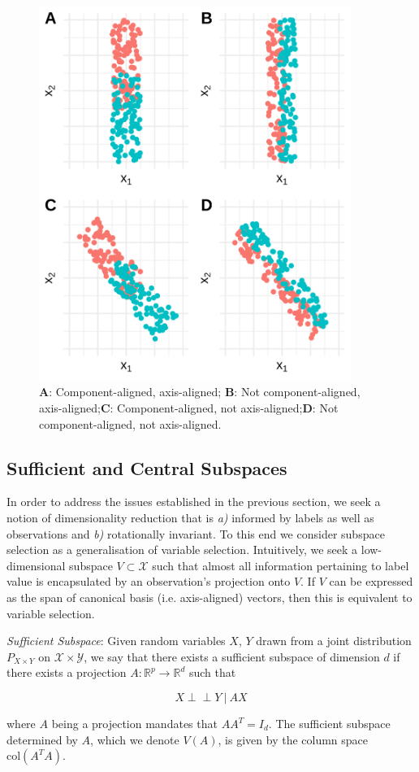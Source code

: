 \documentclass[12pt]{article}
\newenvironment{definition}[1][Definition]{\begin{trivlist}
\item[\hskip \labelsep {\bfseries #1}]}{\end{trivlist}}
\begin{document}
\begin{figure}[htbp]
    \centering
    \includegraphics[width=4in]{figures/ExampleFigures.png}
    \caption{\textbf{A}: Component-aligned, axis-aligned; \textbf{B}: Not component-aligned, axis-aligned;\textbf{C}: Component-aligned, not axis-aligned;\textbf{D}: Not component-aligned, not axis-aligned.\label{fig:examplefigures}}
\end{figure}

\subsection{Sufficient  and Central Subspaces}
In order to address the issues established in the previous section, we seek a notion of dimensionality reduction that is \textit{a)} informed by labels as well as observations and \textit{b)} rotationally invariant. To this end we consider subspace selection as a generalisation of variable selection. Intuitively, we seek a low-dimensional subspace $V \subset \mathcal{X}$ such that almost all information pertaining to label value is encapsulated by an observation's projection onto $V$. If $V$ can be expressed as the span of canonical basis (i.e. axis-aligned) vectors, then this is equivalent to variable selection. 

\begin{definition}
    \textit{Sufficient Subspace}: Given random variables $X$, $Y$ drawn from a joint distribution $P_{X\times Y}$ on $\mathcal{X} \times \mathcal{Y}$, we say that there exists a sufficient subspace of dimension $d$ if there exists a projection $A : \mathbb{R}^p \rightarrow \mathbb{R}^d $ such that 
    
    \[
    X \perp\!\!\!\perp Y\ | \ AX
    \]
    
    where $A$ being a projection mandates that $A {A}^T = I_d$. The sufficient subspace determined by $A$, which we denote $V(A)$, is given by the column space $\text{col}(A^TA)$.
\end{definition}
\end{document}

